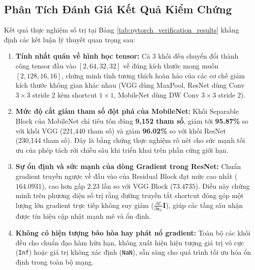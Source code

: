 \documentclass[12pt,a4paper]{report}
\begin{document}
\subsection{Phân Tích Đánh Giá Kết Quả Kiểm Chứng}
Kết quả thực nghiệm số trị tại Bảng \ref{tab:pytorch_verification_results} khẳng định các kết luận lý thuyết quan trọng sau:
\begin{enumerate}[leftmargin=*]
    \item \textbf{Tính nhất quán về hình học tensor:} Cả 3 khối đều chuyển đổi thành công tensor đầu vào $[2, 64, 32, 32]$ về đúng kích thước mong muốn $[2, 128, 16, 16]$, chứng minh tính tương thích hoàn hảo của các cơ chế giảm kích thước không gian khác nhau (VGG dùng MaxPool, ResNet dùng Conv $3\times 3$ stride 2 kèm shortcut $1\times 1$, MobileNet dùng DW Conv $3\times 3$ stride 2).
    \item \textbf{Mức độ cắt giảm tham số đột phá của MobileNet:} Khối Separable Block của MobileNet chỉ tiêu tốn đúng \textbf{9,152 tham số}, giảm tới \textbf{95.87\%} so với khối VGG (221,440 tham số) và giảm \textbf{96.02\%} so với khối ResNet (230,144 tham số). Đây là bằng chứng thực nghiệm rõ nét cho sức mạnh tối ưu của phép tách rời chiều sâu khi triển khai trên phần cứng giới hạn.
    \item \textbf{Sự ổn định và sức mạnh của dòng Gradient trong ResNet:} Chuẩn gradient truyền ngược về đầu vào của Residual Block đạt mức cao nhất ($164.0931$), cao hơn gấp 2.23 lần so với VGG Block ($73.4735$). Điều này chứng minh trên phương diện số trị rằng đường truyền tắt shortcut đóng góp một lượng lớn gradient trực tiếp không suy giảm ($\frac{\partial \mathcal{E}}{\partial \mathbf{x}_L} \mathbf{I}$), giúp các tầng sâu nhận được tín hiệu cập nhật mạnh mẽ và ổn định.
    \item \textbf{Không có hiện tượng bão hòa hay phát nổ gradient:} Toàn bộ các khối đều cho chuẩn đạo hàm hữu hạn, không xuất hiện hiện tượng giá trị vô cực (\texttt{Inf}) hoặc giá trị không xác định (\texttt{NaN}), sẵn sàng cho quá trình tối ưu hóa ổn định trong toàn bộ mạng.
\end{enumerate}


\end{document}
